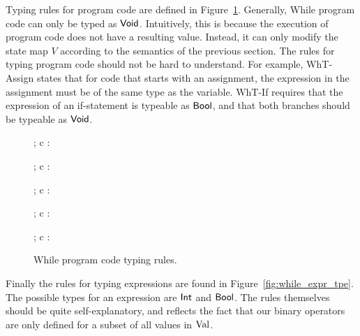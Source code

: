 Typing rules for program code are defined in Figure~\ref{fig:while_code_tpe}.
Generally, While program code can only be typed as $\mbox{$\mathsf{Void}$}$. Intuitively, this is
because the execution of program code does not have a resulting value. Instead,
it can only modify the state map $V$ according to the semantics of the previous
section. The rules for typing program code should not be hard to understand. For
example, {\sc WhT-Assign} states that for code that starts with an assignment,
the expression in the assignment must be of the same type as the variable. {\sc
WhT-If} requires that the expression of an if-statement is typeable as
$\mbox{$\mathsf{Bool}$}$, and that both branches should be typeable as $\mbox{$\mathsf{Void}$}$.

\begin{figure}[]

  \RuleSpace

  {\Gamma \vdash {}; c : \WhVoid}

  \RuleSpace 

  {\Gamma \vdash {}; c : \WhVoid}

  \RuleSpace

  {\Gamma \vdash \WhSkip; c : \WhVoid}

  \RuleSpace

  {\Gamma \vdash {}; c : \WhVoid}

  \RuleSpace

  {\Gamma \vdash {}; c : \WhVoid}

  \caption{While program code typing rules.}
  \label{fig:while_code_tpe}
\end{figure}

Finally the rules for typing expressions are found in
Figure~\ref{fig:while_expr_tpe}. The possible types for an expression are
$\mbox{$\mathsf{Int}$}$ and $\mbox{$\mathsf{Bool}$}$. The rules themselves should be quite self-explanatory,
and reflects the fact that our binary operators are only defined for a subset of
all values in $\mbox{$\mathrm{Val}$}$.

